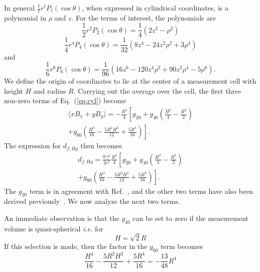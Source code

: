 \documentclass[preprint,12pt]{elsarticle}
\begin{document}
In general $\frac{1}{\ell}r^\ell P_\ell(\cos\theta)$, when expressed
in cylindrical coordinates, is a polynomial in $\rho$ and $z$.  For
the terms of interest, the polynomials are
\begin{equation}
\frac{1}{2}r^2P_2(\cos\theta)=\frac{1}{4}\left(2z^2-\rho^2\right)
\end{equation}
\begin{equation}
\frac{1}{4}r^4P_4(\cos\theta)=\frac{1}{32}\left(8z^{4}-24z^{2}\rho^{2}+3\rho^{4}\right)
\end{equation}
and
\begin{equation}
\frac{1}{6}r^6P_6(\cos\theta)=\frac{1}{96}\left(16z^{6}-120z^{4}\rho^{2}+90z^{2}\rho^{4}-5\rho^{6}\right).
\end{equation}
We define the origin of coordinates to lie at the center of a
measurement cell with height $H$ and radius $R$.  Carrying out the
average over the cell, the first three non-zero terms of
Eq.~(\ref{eq:cyl}) become
\begin{multline}
\label{eq:xbc}
  \langle xB_x+yB_y\rangle
=-\frac{R^{2}}{4}\left[g_{20}
+g_{40}\left(\frac{H^{2}}{4}-\frac{R^2}{2}\right)\right.\\
  \left.+g_{60}\left(\frac{H^{4}}{16}-\frac{5R^2H^2}{12}+\frac{5R^4}{16}\right)\right].
\end{multline}
The expression for $d_{f,Hg}$ then becomes
\begin{multline}
d_{f,Hg}=\frac{\hbar\gamma^{2}}{2c^{2}}\frac{R^2}{4}
\left[g_{20}
+g_{40}\left(\frac{H^{2}}{4}-\frac{R^2}{2}\right)\right.\\
  \left.+g_{60}\left(\frac{H^{4}}{16}-\frac{5R^2H^2}{12}+\frac{5R^4}{16}\right)\right].
\end{multline}
The $g_{20}$ term is in agreement with Ref.~\cite{bib:pignol-roccia},
and the other two terms have also been derived
previously~\cite{bib:pignol-priv}.  We now analyze the next two terms.


An immediate observation is that the $g_{40}$ can be set to zero if
the measurement volume is quasi-spherical {\it i.e.} for
\begin{equation}
\label{eq:h}
H=\sqrt{2}R
\end{equation}
If this selection is made, then the factor in the $g_{60}$ term becomes
\begin{equation}
\frac{H^{4}}{16}-\frac{5R^2H^2}{12}+\frac{5R^4}{16}=-\frac{13}{48}R^4
\end{equation}
\end{document}
